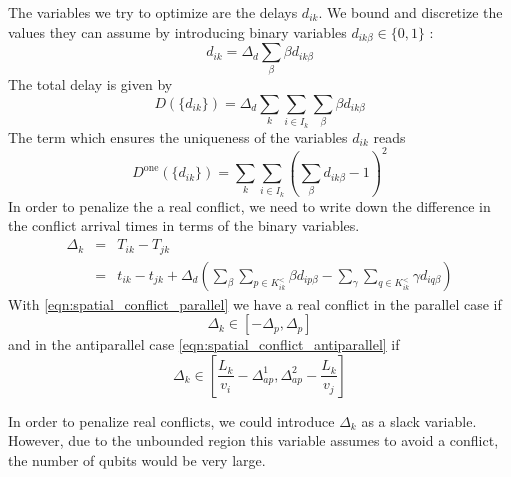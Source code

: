 \documentclass{article}
\begin{document}
The variables we try to optimize are the delays $d_{ik}$.
We bound and discretize the values they can assume by introducing binary variables $d_{ik\beta}\in\{0, 1\}$ :
\begin{equation*}
    d_{ik} = \Delta_d \sum_\beta \beta d_{ik\beta}
\end{equation*}
The total delay is given by
\begin{equation}
    D(\{d_{ik}\}) = \Delta_d \sum_k \sum_{i \in I_k} \sum_\beta \beta d_{ik\beta}
\end{equation}
The term which ensures the uniqueness of the variables $d_{ik}$ reads
\begin{equation}
    D^\text{one}(\{d_{ik}\})  =  \sum_k \sum_{i \in I_k} \left( \sum_\beta d_{ik\beta} - 1\right)^2
\end{equation}
In order to penalize the a real conflict, we need to write down the difference in the conflict arrival times in terms of the binary variables.
\begin{eqnarray*}
    \Delta_k &=& T_{ik} - T_{jk} \\
             &=& t_{ik} - t_{jk} + \Delta_d \left( \sum_\beta \sum_{p\in K^<_{ik}} \beta d_{ip\beta}  - \sum_\gamma \sum_{q\in K^<_{ik}} \gamma d_{iq\beta} \right)
\end{eqnarray*}
With \eqref{eqn:spatial_conflict_parallel} we have a real conflict in the parallel case if
\begin{equation*}
    \Delta_k \in [-\Delta_p, \Delta_p]
\end{equation*}
and in the antiparallel case \eqref{eqn:spatial_conflict_antiparallel} if
\begin{equation*}
    \Delta_k \in \left[\frac{L_k}{v_i} - \Delta^1_{ap}, \Delta^2_{ap} - \frac{L_k}{v_j}\right]
\end{equation*}

In order to penalize real conflicts, we could introduce $\Delta_k$ as a slack variable.
However, due to the unbounded region this variable assumes to avoid a conflict, the number of qubits would be very large.
\end{document}
